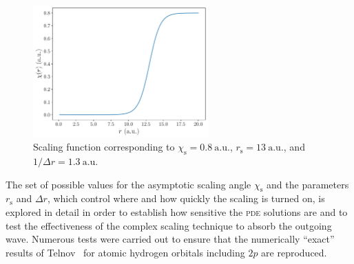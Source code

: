 \begin{figure}
  \centering
  \includegraphics[width=0.6\textwidth]{figures/ch_H2O/1b1_1b2/scaling.pdf}
  \caption{Scaling function corresponding to $\chi_{\mathrm{s}} =
    0.8\ \mathrm{a.u.}$, $r_{\mathrm{s}} = 13\ \mathrm{a.u.}$, and $1
    / \Delta r = 1.3\ \mathrm{a.u.}$}
  \label{fig:scaling}
\end{figure}


The set of possible values for the asymptotic scaling angle
$\chi_{\mathrm{s}}$ and the parameters $r_{\mathrm{s}}$ and $\Delta
r$, which control where and how quickly the scaling is turned on, is
explored in detail in order to establish how sensitive the
\textsc{pde} solutions are and to test the effectiveness of the
complex scaling technique to absorb the outgoing wave. Numerous tests
were carried out to ensure that the numerically ``exact'' results of
Telnov~\cite{Telnov_1989} for atomic hydrogen orbitals including $2p$
are reproduced.

